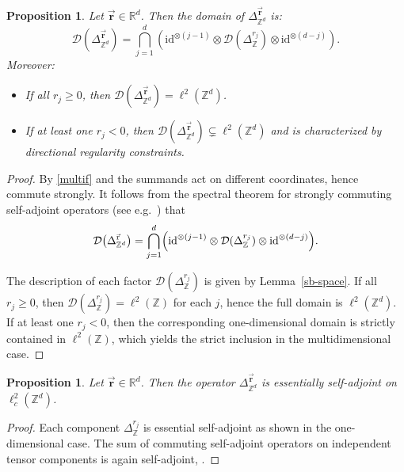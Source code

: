 \documentclass[10pt]{amsart} %
\newcommand{\1}{{\mathbb{I}}}
\numberwithin{equation}{section}
\newtheorem{proposition}[theorem]{Proposition}%
\begin{document}
\begin{proposition}
Let $\vec{\mathbf{r} }\in \mathbb{R}^d$. Then the domain of $\Delta_{\mathbb{Z}^d}^{\vec{\mathbf{r}}}$ is:
\[
\mathcal{D}\left( \Delta_{\mathbb{Z}^d}^{\vec{\mathbf{r}}} \right) = \bigcap_{j=1}^d \left( \mathrm{id}^{\otimes(j-1)} \otimes \mathcal{D}\left( \Delta_{\mathbb{Z}}^{r_j} \right) \otimes \mathrm{id}^{\otimes(d-j)} \right).
\]
Moreover:
\begin{itemize}
    \item If all $r_j \geq 0$, then $\mathcal{D}(\Delta_{\mathbb{Z}^d}^{\vec{\mathbf{r}}}) = \ell^2(\mathbb{Z}^d)$.
    \item If at least one $r_j < 0$, then $\mathcal{D}(\Delta_{\mathbb{Z}^d}^{\vec{\mathbf{r}}}) \subsetneq \ell^2(\mathbb{Z}^d)$ and is characterized by directional regularity constraints.
\end{itemize}
\end{proposition}
\begin{proof}
By \eqref{multif} and the summands act on different coordinates, hence commute strongly.
It follows from the spectral theorem for strongly commuting self-adjoint operators
(see e.g.\ \cite[Thm.~5.29]{Schmudgen2012})
that
\[
\mathcal{D}\!\left(\Delta_{\mathbb{Z}^d}^{\vec{\mathrm{r}}}\right)
=\bigcap_{j=1}^d \Bigl(\mathrm{id}^{\otimes(j-1)} \otimes \mathcal{D}(\Delta_{\mathbb{Z}}^{r_j}) \otimes \mathrm{id}^{\otimes(d-j)}\Bigr).
\]

The description of each factor $\mathcal{D}(\Delta_{\mathbb{Z}}^{r_j})$
is given by Lemma~\ref{sb-space}.
If all $r_j\ge0$, then $\mathcal{D}(\Delta_{\mathbb{Z}}^{r_j})=\ell^2(\mathbb{Z})$ for each $j$,
hence the full domain is $\ell^2(\mathbb{Z}^d)$.
If at least one $r_j<0$, then the corresponding one-dimensional domain is strictly contained in $\ell^2(\mathbb{Z})$,
which yields the strict inclusion in the multidimensional case.
\end{proof}

\begin{proposition}\label{ESA}
Let $\vec{\mathbf{r}} \in \mathbb{R}^d$. Then the operator $\Delta_{\mathbb{Z}^d}^{\vec{\mathbf{r}}}$ is essentially self-adjoint on $\ell^2_c(\mathbb{Z}^d)$.
\end{proposition}

\begin{proof}
Each component $\Delta_{\mathbb{Z}}^{r_j}$ is essential self-adjoint as shown in the one-dimensional case. The sum of commuting self-adjoint operators on independent tensor components is again self-adjoint, \cite{Da}.
\end{proof}
\end{document}
